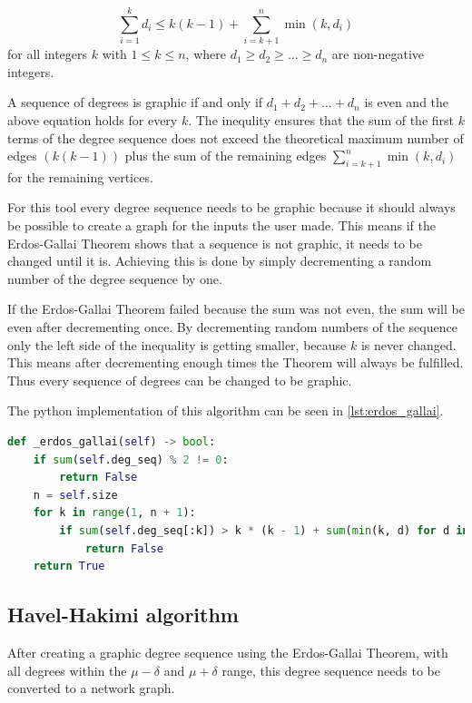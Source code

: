 \begin{equation}
\sum_{i=1}^{k} d_i \leq k(k-1) + \sum_{i=k+1}^{n} \min(k, d_i)
\end{equation}
for all integers \(k\) with \(1 \leq k \leq n\), where \(d_1 \geq d_2 \geq \ldots \geq d_n\) are non-negative integers.

A sequence of degrees is graphic if and only if \(d_1 + d_2 + \ldots + d_n\) is even and the above equation holds for every $k$. The inequlity ensures that the sum of the first $k$ terms of the degree sequence does not exceed the theoretical maximum number of edges $(k(k-1))$ plus the sum of the remaining edges $\sum_{i=k+1}^{n} \min(k, d_i)$ for the remaining vertices.

For this tool every degree sequence needs to be graphic because it should always be possible to create a graph for the inputs the user made. This means if the Erdos-Gallai Theorem shows that a sequence is not graphic, it needs to be changed until it is. Achieving this is done by simply decrementing a random number of the degree sequence by one.

If the Erdos-Gallai Theorem failed because the sum was not even, the sum will be even after decrementing once. By decrementing random numbers of the sequence only the left side of the inequality is getting smaller, because $k$ is never changed. This means after decrementing enough times the Theorem will always be fulfilled. Thus every sequence of degrees can be changed to be graphic.

The python implementation of this algorithm can be seen in \ref{lst:erdos_gallai}.

\begin{lstlisting}[language=python, caption={Erdos-Gallai Theorem in Python}, label={lst:erdos_gallai}]
def _erdos_gallai(self) -> bool:
    if sum(self.deg_seq) % 2 != 0:
        return False
    n = self.size
    for k in range(1, n + 1):
        if sum(self.deg_seq[:k]) > k * (k - 1) + sum(min(k, d) for d in self.deg_seq[k + 1 :]):
            return False
    return True
\end{lstlisting}

\subsection{Havel-Hakimi algorithm}
\label{sub:havel_hakimi}
After creating a graphic degree sequence using the Erdos-Gallai Theorem, with all degrees within the $\mu - \delta$ and $\mu + \delta$ range, this degree sequence needs to be converted to a network graph.

